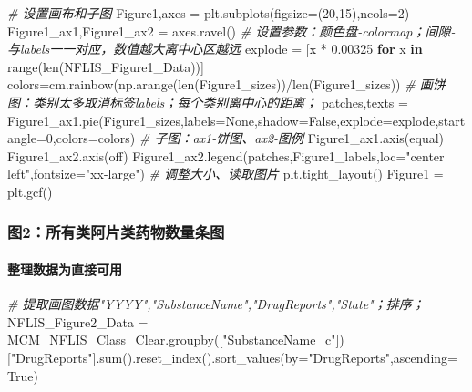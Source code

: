 \documentclass[
]{article}
\newenvironment{Shaded}{}{}
\newcommand{\BuiltInTok}[1]{#1}
\newcommand{\CommentTok}[1]{\textcolor[rgb]{0.38,0.63,0.69}{\textit{#1}}}
\newcommand{\ControlFlowTok}[1]{\textcolor[rgb]{0.00,0.44,0.13}{\textbf{#1}}}
\newcommand{\DecValTok}[1]{\textcolor[rgb]{0.25,0.63,0.44}{#1}}
\newcommand{\FloatTok}[1]{\textcolor[rgb]{0.25,0.63,0.44}{#1}}
\newcommand{\KeywordTok}[1]{\textcolor[rgb]{0.00,0.44,0.13}{\textbf{#1}}}
\newcommand{\NormalTok}[1]{#1}
\newcommand{\OperatorTok}[1]{\textcolor[rgb]{0.40,0.40,0.40}{#1}}
\newcommand{\StringTok}[1]{\textcolor[rgb]{0.25,0.44,0.63}{#1}}
\newcommand{\VariableTok}[1]{\textcolor[rgb]{0.10,0.09,0.49}{#1}}
\begin{document}
\begin{Shaded}
\begin{Highlighting}[]
\CommentTok{\# 设置画布和子图}
\NormalTok{Figure1,axes }\OperatorTok{=}\NormalTok{ plt.subplots(figsize}\OperatorTok{=}\NormalTok{(}\DecValTok{20}\NormalTok{,}\DecValTok{15}\NormalTok{),ncols}\OperatorTok{=}\DecValTok{2}\NormalTok{)}
\NormalTok{Figure1\_ax1,Figure1\_ax2 }\OperatorTok{=}\NormalTok{ axes.ravel()}
\CommentTok{\# 设置参数：颜色盘{-}colormap；间隙{-}与labels一一对应，数值越大离中心区越远}
\NormalTok{explode }\OperatorTok{=}\NormalTok{ [x }\OperatorTok{*} \FloatTok{0.00325} \ControlFlowTok{for}\NormalTok{ x }\KeywordTok{in} \BuiltInTok{range}\NormalTok{(}\BuiltInTok{len}\NormalTok{(NFLIS\_Figure1\_Data))]  }
\NormalTok{colors}\OperatorTok{=}\NormalTok{cm.rainbow(np.arange(}\BuiltInTok{len}\NormalTok{(Figure1\_sizes))}\OperatorTok{/}\BuiltInTok{len}\NormalTok{(Figure1\_sizes))}
\CommentTok{\# 画饼图：类别太多取消标签labels；每个类别离中心的距离；}
\NormalTok{patches,texts }\OperatorTok{=}\NormalTok{ Figure1\_ax1.pie(Figure1\_sizes,labels}\OperatorTok{=}\VariableTok{None}\NormalTok{,shadow}\OperatorTok{=}\VariableTok{False}\NormalTok{,explode}\OperatorTok{=}\NormalTok{explode,startangle}\OperatorTok{=}\DecValTok{0}\NormalTok{,colors}\OperatorTok{=}\NormalTok{colors)}
\CommentTok{\# 子图：ax1{-}饼图、ax2{-}图例}
\NormalTok{Figure1\_ax1.axis(}\StringTok{\textquotesingle{}equal\textquotesingle{}}\NormalTok{)}
\NormalTok{Figure1\_ax2.axis(}\StringTok{\textquotesingle{}off\textquotesingle{}}\NormalTok{)}
\NormalTok{Figure1\_ax2.legend(patches,Figure1\_labels,loc}\OperatorTok{=}\StringTok{"center left"}\NormalTok{,fontsize}\OperatorTok{=}\StringTok{"xx{-}large"}\NormalTok{)}
\CommentTok{\# 调整大小、读取图片}
\NormalTok{plt.tight\_layout()}
\NormalTok{Figure1 }\OperatorTok{=}\NormalTok{ plt.gcf()}
\end{Highlighting}
\end{Shaded}

\hypertarget{header-n232}{%
\subsubsection{图2：所有类阿片类药物数量条图}\label{header-n232}}

\hypertarget{header-n233}{%
\paragraph{整理数据为直接可用}\label{header-n233}}

\begin{Shaded}
\begin{Highlighting}[]
\CommentTok{\# 提取画图数据"YYYY","SubstanceName","DrugReports","State"；排序；}
\NormalTok{NFLIS\_Figure2\_Data }\OperatorTok{=}\NormalTok{ MCM\_NFLIS\_Class\_Clear.groupby([}\StringTok{"SubstanceName\_c"}\NormalTok{])[}\StringTok{"DrugReports"}\NormalTok{].}\BuiltInTok{sum}\NormalTok{().reset\_index().sort\_values(by}\OperatorTok{=}\StringTok{"DrugReports"}\NormalTok{,ascending}\OperatorTok{=}\VariableTok{True}\NormalTok{)}
\end{Highlighting}
\end{Shaded}
\end{document}
